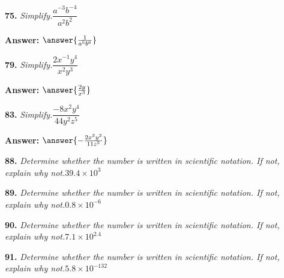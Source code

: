 \documentclass{ximera}
\begin{document}
\begin{problem}
\textbf{75.} \emph{Simplify.}\quad $\dfrac{a^{-3}b^{-4}}{a^2b^2}$

\textbf{Answer:} $\answer{\frac{1}{a^5b^6}}$
\end{problem}

\begin{problem}
\textbf{79.} \emph{Simplify.}\quad $\dfrac{2x^{-1}y^4}{x^2y^3}$

\textbf{Answer:} $\answer{\frac{2y}{x^3}}$
\end{problem}

\begin{problem}
\textbf{83.} \emph{Simplify.}\quad $\dfrac{-8x^2y^4}{44y^2z^5}$

\textbf{Answer:} $\answer{-\frac{2x^2y^2}{11z^5}}$
\end{problem}

\begin{problem}
\textbf{88.} \emph{Determine whether the number is written in scientific notation. If not, explain why not.}\quad $39.4 \times 10^3$

\begin{multipleChoice}
\end{multipleChoice}
\end{problem}

\begin{problem}
\textbf{89.} \emph{Determine whether the number is written in scientific notation. If not, explain why not.}\quad $0.8 \times 10^{-6}$

\begin{multipleChoice} 
\end{multipleChoice}
\end{problem}

\begin{problem}
\textbf{90.} \emph{Determine whether the number is written in scientific notation. If not, explain why not.}\quad $7.1 \times 10^{2.4}$

\begin{multipleChoice}
\end{multipleChoice}
\end{problem}

\begin{problem}
\textbf{91.} \emph{Determine whether the number is written in scientific notation. If not, explain why not.}\quad $5.8 \times 10^{-132}$

\begin{multipleChoice} 
\end{multipleChoice}
\end{problem}
\end{document}
